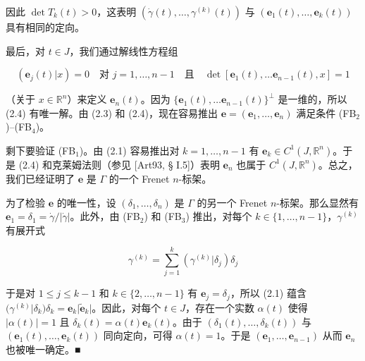 \begin{theorem}
\begin{subitems}
因此 $ \det T_k(t) > 0 $，这表明 $ (\dot\gamma(t), \ldots, \gamma^{(k)}(t)) $ 与 $ (\mathbf{e}_1(t), \ldots, \mathbf{e}_k(t)) $ 具有相同的定向。

\item

最后，对 $ t \in J $，我们通过解线性方程组

\begin{equation}
(\mathbf{e}_j(t)|x) = 0 \quad \text{对 } j = 1, \ldots, n - 1 \quad \text{且} \quad \det[\mathbf{e}_1(t), \ldots \mathbf{e}_{n-1}(t), x] = 1\tag{2.4}
\end{equation}

（关于 $ x \in \mathbb{R}^n $）来定义 $ \mathbf{e}_n(t) $。因为 $ \{\mathbf{e}_1(t), \ldots \mathbf{e}_{n-1}(t)\}^{\perp} $ 是一维的，所以 (2.4) 有唯一解。由 (2.3) 和 (2.4)，现在容易推出 $ \mathbf{e} = (\mathbf{e}_1, \ldots, \mathbf{e}_n) $ 满足条件 (FB$ {}_{2} $)–(FB$ {}_{4} $)。

\item

剩下要验证 (FB$ {}_{1} $)。由 (2.1) 容易推出对 $ k = 1, \ldots, n - 1 $ 有 $ \mathbf{e}_k \in C^1(J, \mathbb{R}^n) $。于是 (2.4) 和克莱姆法则（参见 [Art93, § I.5]）表明 $ \mathbf{e}_n $ 也属于 $ C^1(J, \mathbb{R}^n) $。总之，我们已经证明了 $ \mathbf{e} $ 是 $ \Gamma $ 的一个 Frenet $ n $-标架。

\item

为了检验 $ \mathbf{e} $ 的唯一性，设 $ (\delta_1, \ldots, \delta_n) $ 是 $ \Gamma $ 的另一个 Frenet $ n $-标架。那么显然有 $ \mathbf{e}_1 = \delta_1 = \dot\gamma/|\dot\gamma| $。此外，由 (FB$ {}_{2} $) 和 (FB$ {}_{3} $) 推出，对每个 $ k \in \{1, \ldots, n - 1\} $，$ \gamma^{(k)} $ 有展开式

\[
\gamma^{(k)} = \sum_{j=1}^{k}(\gamma^{(k)}|\delta_j)\delta_j
\]

于是对 $ 1 \le j \le k - 1 $ 和 $ k \in \{2, \ldots, n - 1\} $ 有 $ \mathbf{e}_j = \delta_j $，所以 (2.1) 蕴含 $ (\gamma^{(k)}|\delta_k)\delta_k = \mathbf{e}_k|\widetilde{\mathbf{e}}_k| $。因此，对每个 $ t \in J $，存在一个实数 $ \alpha(t) $ 使得 $ |\alpha(t)| = 1 $ 且 $ \delta_k(t) = \alpha(t)\mathbf{e}_k(t) $。由于 $ (\delta_1(t), \ldots, \delta_k(t)) $ 与 $ (\mathbf{e}_1(t), \ldots, \mathbf{e}_k(t)) $ 同向定向，可得 $ \alpha(t) = 1 $。于是 $ (\mathbf{e}_1, \ldots, \mathbf{e}_{n-1}) $ 从而 $ \mathbf{e}_n $ 也被唯一确定。\nobreak\hspace{0.35em}■

\end{subitems}

\end{theorem}


